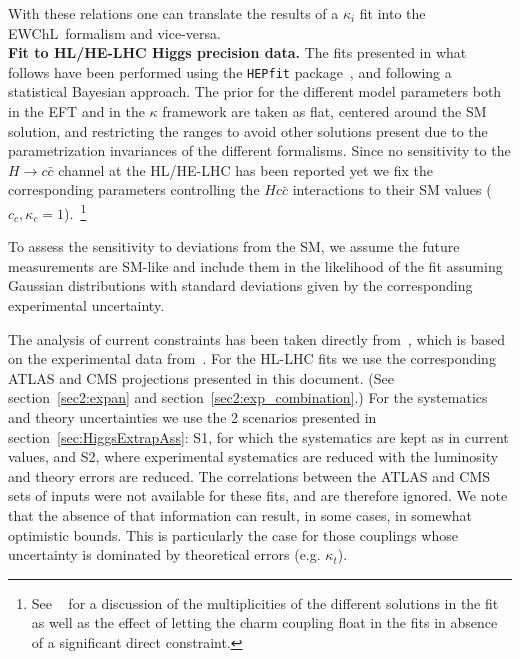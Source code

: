 %
With these relations one can translate the results of a $\kappa_i$ fit into the EWChL~formalism and vice-versa. \\

\noindent
{\bf Fit to HL/HE-LHC Higgs precision data.}
The fits presented in what follows have been performed using the {\tt HEPfit} package~\cite{hepfit,hepfitsite}, and following a statistical Bayesian approach.  
 The prior for the different model parameters both in the EFT and in the $\kappa$ framework are taken as flat, centered around the SM solution, and restricting the ranges to avoid other solutions present due to the parametrization invariances of the different formalisms.
Since no sensitivity to the $H\to c\bar{c}$ channel at the HL/HE-LHC has been reported yet we fix the corresponding parameters controlling the $Hc\bar c$ interactions to their SM values ($c_c,\kappa_c=1$).~\footnote{See ~\cite{deBlas:2018tjm} for a discussion of the multiplicities of the different solutions in the fit as well as the effect of letting the charm coupling float in the fits in absence of a significant direct constraint.}

To assess the sensitivity to deviations from the SM, we assume the future measurements are SM-like and include them in the likelihood of the fit assuming Gaussian distributions with standard deviations given by the corresponding experimental uncertainty. 

The analysis of current constraints has been taken directly from~\cite{deBlas:2018tjm}, which is based on the experimental data from~\cite{Aaltonen:2013ipa,Abazov:2013gmz,Chatrchyan:2013iaa,Chatrchyan:2013vaa,Chatrchyan:2013zna,Aad:2014eha,Aad:2014eva,Aad:2014xzb,ATLAS:2014aga,Chatrchyan:2014nva,Khachatryan:2014ira,Khachatryan:2014jba,Khachatryan:2014qaa,Aad:2015gba,Aad:2015gra,Aad:2015ona,Aad:2015vsa,ATLAS:2016gld,CMS:2016mmc,Khachatryan:2016vau,Aaboud:2017jvq,Aaboud:2017ojs,Aaboud:2017rss,Aaboud:2017uhw,Aaboud:2017vzb,Aaboud:2017xsd,CMS:2017rli,CMS-PAS-HIG-17-007,CMS-PAS-HIG-17-019,Sirunyan:2017elk,Sirunyan:2017exp,Sirunyan:2017khh,Aaboud:2018xdt,ATLAS-CONF-2018-004,Sirunyan:2018egh,Sirunyan:2018mvw,Sirunyan:2018shy,Sirunyan:2018ygk}. 
For the HL-LHC fits we use the corresponding ATLAS and CMS projections presented in this document. (See section~\ref{sec2:expan} and section~\ref{sec2:exp_combination}.)  For the systematics and theory uncertainties we use the 2 scenarios presented in section~\ref{sec:HiggsExtrapAss}: S1, for which the systematics are kept as in current values, and S2, where experimental systematics are reduced with the luminosity and theory errors are reduced.
%
The correlations between the ATLAS and CMS sets of inputs were not available for these fits, and are therefore ignored. We note that the absence of that information can result, in some cases, in somewhat optimistic bounds. This is particularly the case for those couplings whose uncertainty is dominated by theoretical errors (e.g. $\kappa_t$).

